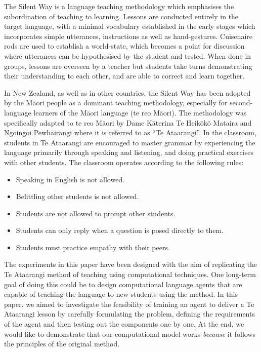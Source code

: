 The Silent Way \cite{gattegno2010teaching} is a language teaching methodology which emphasises the subordination of teaching to learning. Lessons are conducted entirely in the target language, with a minimal vocabulary established in the early stages which incorporates simple utterances, instructions as well as hand-gestures. Cuisenaire rods are used to establish a world-state, which becomes a point for discussion where utterances can be hypothesised by the student and tested. When done in groups, lessons are overseen by a teacher but students take turns demonstrating their understanding to each other, and are able to correct and learn together.

In New Zealand, as well as in other countries, the Silent Way has been adopted by the Māori people as a dominant teaching methodology, especially for second-language learners of the Māori language (te reo Māori). The methodology was specifically adapted to te reo Māori \cite{mataira1980effectiveness,ka2008ngoingoi} by Dame Kāterina Te Heikōkō Mataira and Ngoingoi Pewhairangi where it is referred to as ``Te Ataarangi''. In the classroom, students in Te Ataarangi are encouraged to master grammar by experiencing the language primarily through speaking and listening, and doing practical exercises with other students. The classroom operates according to the following rules:

\begin{itemize}
  \item Speaking in English is not allowed.
  \item Belittling other students is not allowed.
  \item Students are not allowed to prompt other students.
  \item Students can only reply when a question is posed directly to them.
  \item Students must practice empathy with their peers.
\end{itemize}

The experiments in this paper have been designed with the aim of replicating the Te Ataarangi method of teaching using computational techniques. One long-term goal of doing this could be to design computational language agents that are capable of teaching the language to new students using the method. In this paper, we aimed to investigate the feasibility of training an agent to deliver a Te Ataarangi lesson by carefully formulating the problem, defining the requirements of the agent and then testing out the components one by one. At the end, we would like to demonstrate that our computational model works \textit{because} it follows the principles of the original method.

